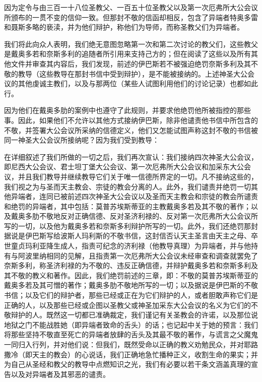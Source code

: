因为定令与由三百一十八位圣教父、一百五十位圣教父以及第一次厄弗所大公会议所颁布的一贯不变的信仰一致。但那封不敬的信函却相反，包含了异端者特奥多雷和聂斯多略的亵渎，并为他们辩护，称他们为导师，而称圣教父们为异端者。\par

我们将此向众人表明，我们绝无意图忽略第一次和第二次讨论的教父们，这些教父是戴奥多若和奈斯多利的追随者所引用来支持己方的；但在阅读了这些以及所有其他文件并审查其内容后，我们发现，前述的伊巴斯若不被强迫绝罚奈斯多利及其不敬的教导（这些教导在那封书信中受到辩护），是不能被接纳的。上述神圣大公会议的其他虔诚主教们，以及与那两位（某些人试图利用他们的讨论记录）也都如此行。\par

因为他们在戴奥多肋的案例中也遵守了此规则，并要求他绝罚他所被指控的那些事。因此，如果他们不允许以其他方式接纳伊巴斯，除非他谴责他书信中所包含的不敬，并签署大公会议所采纳的信德定义，他们又怎能试图声称这封不敬的书信被同一神圣大公会议所接纳呢？因为我们受到教导：\par

在详细叙述了我们所做的一切之后，我们再次宣认：我们接纳四次神圣大公会议，即尼西大公会议、君士坦丁堡大公会议、第一次厄弗所大公会议和加采东大公会议，并且我们教导并继续教导它们关于唯一信德所界定的一切。凡不接纳这些的，我们视之为与圣而天主教会、宗徒的教会分离的人。此外，我们谴责并绝罚一切其他异端者，连同已被前述四次神圣大公会议以及圣而天主教会和宗徒的教会所谴责和绝罚的异端者，其中包括：莫普苏埃斯蒂亚的主教戴奥多若及其不敬的著作；以及戴奥多肋不敬地反对正确信德、反对圣济利禄的、反对第一次厄弗所大公会议所写的一切，以及他为戴奥多若和奈斯多利辩护所写的一切。此外，我们还绝罚那封据说是伊巴斯写给波斯人玛利斯的不敬书信，这封信否认天主圣言由天主之母、卒世童贞玛利亚降生成人，指责可纪念的济利禄（他教导真理）为异端者，并与他持有与阿波里纳相同的见解，且指责第一次厄弗所大公会议未经审查和调查就罢免了奈斯多利，称圣济利禄的为不敬的、违反正确信德，并辩护戴奥多若和奈斯多利及其不敬的教义和著作。因此，我们绝罚前述的三章，即：不敬的莫普苏埃斯蒂亚的戴奥多若及其可憎的著作；戴奥多肋不敬地所写的一切；以及据说是伊巴斯的不敬书信；以及它们的辩护者，那些已经或正在为它们辩护的人，或者胆敢声称它们是正确的人，以及那些已经或企图以圣教父或神圣加采东大公会议的名义为它们的不敬辩护的人。既然这一切都已准确裁定，我们谨记有关圣教会的许诺，以及那位说地狱之门不能战胜她（即异端者致命的舌头）的话；也记起中关于她的预言：我们将那些坚持不敬直至死亡的异端者放肆的舌头及其最不敬的著作，与谎言之父魔鬼一同归入行列，并对他们说：但我们，既然受命以正确的教义劝勉民众，并对耶路撒冷（即天主的教会）的心说话，我们正确地急忙播种正义，收割生命的果实；并为自己从圣经和教父的教导中点燃知识之光，我们有必要以若干条文涵盖真理的宣告以及对异端者及其邪恶的谴责。\par

